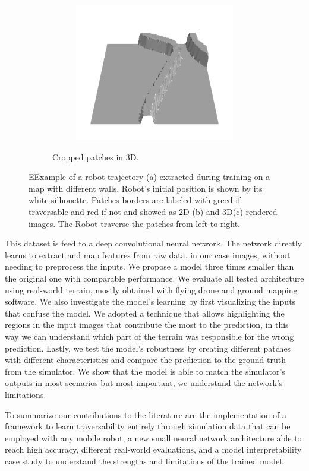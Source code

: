 \documentclass[../document.tex]{subfiles}
\begin{document}
\begin{figure}[H]
\begin{subfigure}[b]{1\textwidth}
\begin{subfigure}[b]{0.19\textwidth}
    \includegraphics[width=\linewidth]{../img/bars1-example-patches/3d/14.png}    
    \end{subfigure}  
\caption{Cropped patches in 3D.}
\label{fig : patch-extraction}
\end{subfigure}
\caption{EExample of a robot trajectory (a) extracted during training on a map with different walls. Robot's initial position is shown by its white silhouette. Patches borders are labeled with greed if traversable and red if not and showed as 2D (b) and 3D(c) rendered images. The Robot traverse the patches from left to right.}
\end{figure}

This dataset is feed to a deep convolutional neural network. The network directly learns to extract and map features from raw data, in our case images, without needing to preprocess the inputs. We propose a model three times smaller than the original one with comparable performance. We evaluate all tested architecture using real-world terrain, mostly obtained with flying drone and ground mapping software. 
We also investigate the model's learning by first visualizing the inputs that confuse the model. We adopted a technique that allows highlighting the regions in the input images that contribute the most to the prediction, in this way we can understand which part of the terrain was responsible for the wrong prediction. Lastly, we test the model's robustness by creating different patches with different characteristics and compare the prediction to the ground truth from the simulator. We show that the model is able to match the simulator's outputs in most scenarios but most important, we understand the network's limitations.

To summarize our contributions to the literature are the implementation of a framework to learn traversability entirely through simulation data that can be employed with any mobile robot, a new small neural network architecture able to reach high accuracy, different real-world evaluations, and a model interpretability case study to understand the strengths and limitations of the trained model. 
\end{document}
